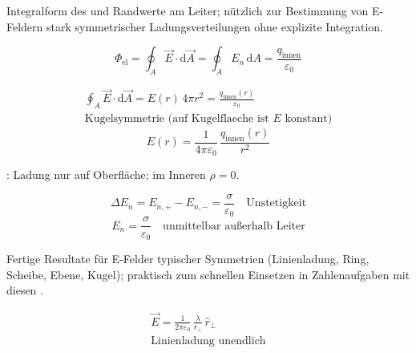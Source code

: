 \begin{runintext}
Integralform des  und Randwerte am Leiter; nützlich zur Bestimmung von E-Feldern stark symmetrischer Ladungsverteilungen ohne explizite Integration.
\end{runintext}
\begin{formulabox}
\[ \Phi_{\mathrm{el}} = \oint_A \vec{E}\cdot\mathrm{d}\vec{A} = \oint_A E_n\,\mathrm{d}A = \frac{q_{\mathrm{innen}}}{\varepsilon_0} \]
\end{formulabox}
\begin{formulabox}
\[
\begin{gathered}
\oint_A \vec{E}\cdot\mathrm{d}\vec{A} = E(r)\,4\pi r^2 = \frac{q_{\mathrm{innen}}(r)}{\varepsilon_0} \\[-2pt]
\text{Kugelsymmetrie (auf Kugelflaeche ist $E$ konstant)}
\end{gathered}
\]
\[ E(r) = \frac{1}{4\pi\varepsilon_0}\,\frac{q_{\mathrm{innen}}(r)}{r^2} \]
\end{formulabox}
\begin{runintext}
: Ladung nur auf Oberfläche; im Inneren $\rho=0$.
\end{runintext}
\begin{formulabox}
\[ \Delta E_n = E_{n,+} - E_{n,-} = \frac{\sigma}{\varepsilon_0} \quad \text{Unstetigkeit} \]
\[ E_n = \frac{\sigma}{\varepsilon_0} \quad \text{unmittelbar außerhalb Leiter} \]
\end{formulabox}

\begin{runintext}
Fertige Resultate für E-Felder typischer Symmetrien (Linienladung, Ring, Scheibe, Ebene, Kugel); praktisch zum schnellen Einsetzen in Zahlenaufgaben mit diesen .
\end{runintext}
\begin{formulabox}
\[
\begin{gathered}
\vec{E} = \frac{1}{2\pi\varepsilon_0}\,\frac{\lambda}{r_\perp}\,\hat{r}_\perp \\[-2pt]
\text{Linienladung unendlich}
\end{gathered}
\]
\end{formulabox}

